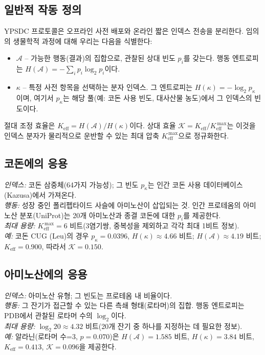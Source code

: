 \documentclass[12pt,a4paper]{article}
\newcommand{\REL}{\mathcal{K}}          %
\newcommand{\ABS}{K_{\mathrm{eff}}}     %
\begin{document}
	\subsection{일반적 작동 정의}
	YPSDC 프로토콜은 오프라인 사전 배포와 온라인 짧은 인덱스 전송을 분리한다. 임의의 생물학적 과정에 대해 우리는 다음을 식별한다:
	\begin{itemize}
		\item \(\mathcal{A}\) – 가능한 행동(결과)의 집합으로, 관찰된 상대 빈도 \(p_i\)를 갖는다. 행동 엔트로피는 \(H(\mathcal{A}) = -\sum_i p_i \log_2 p_i\)이다.
		\item \(\kappa\) – 특정 사전 항목을 선택하는 분자 인덱스. 그 엔트로피는 \(H(\kappa) = -\log_2 p_\kappa\)이며, 여기서 \(p_\kappa\)는 해당 풀(예: 코돈 사용 빈도, 대사산물 농도)에서 그 인덱스의 빈도이다.
	\end{itemize}
	절대 조정 효율은 \(\ABS = H(\mathcal{A})/H(\kappa)\)이다. 상대 효율 \(\REL = \ABS / \ABS^{\,\max}\)는 이것을 인덱스 분자가 물리적으로 운반할 수 있는 최대 압축 \(\ABS^{\,\max}\)으로 정규화한다.
	
	\subsection{코돈에의 응용}
	\textit{인덱스:} 코돈 삼중체(64가지 가능성); 그 빈도 \(p_\kappa\)는 인간 코돈 사용 데이터베이스(Kazusa)에서 가져온다.\\
	\textit{행동:} 성장 중인 폴리펩타이드 사슬에 아미노산이 삽입되는 것. 인간 프로테옴의 아미노산 분포(UniProt)는 20개 아미노산과 종결 코돈에 대한 \(p_i\)를 제공한다.\\
	\textit{최대 용량:} \(\ABS^{\,\max}=6\) 비트(3염기쌍, 중복성을 제외하고 각각 최대 1비트 정보).\\
	\textit{예:} 코돈 CUG (Leu)의 경우 \(p_\kappa=0.0396\), \(H(\kappa)\approx4.66\) 비트; \(H(\mathcal{A})\approx4.19\) 비트; \(\ABS=0.900\), 따라서 \(\REL=0.150\).
	
	\subsection{아미노산에의 응용}
	\textit{인덱스:} 아미노산 유형; 그 빈도는 프로테옴 내 비율이다.\\
	\textit{행동:} 그 잔기가 접근할 수 있는 다른 측쇄 형태(로타머)의 집합. 행동 엔트로피는 PDB에서 관찰된 로타머 수의 \(\log_2\)이다.\\
	\textit{최대 용량:} \(\log_2 20 \approx 4.32\) 비트(20개 잔기 중 하나를 지정하는 데 필요한 정보).\\
	\textit{예:} 알라닌(로타머 수=3, \(p=0.070\))은 \(H(\mathcal{A})=1.585\) 비트, \(H(\kappa)=3.84\) 비트, \(\ABS=0.413\), \(\REL=0.096\)을 제공한다.
	
\end{document}
